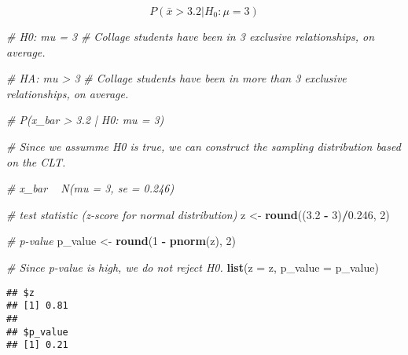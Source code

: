 \documentclass[]{book}
\newenvironment{Shaded}{\begin{snugshade}}{\end{snugshade}}
\newcommand{\CommentTok}[1]{\textcolor[rgb]{0.56,0.35,0.01}{\textit{#1}}}
\newcommand{\DataTypeTok}[1]{\textcolor[rgb]{0.13,0.29,0.53}{#1}}
\newcommand{\DecValTok}[1]{\textcolor[rgb]{0.00,0.00,0.81}{#1}}
\newcommand{\FloatTok}[1]{\textcolor[rgb]{0.00,0.00,0.81}{#1}}
\newcommand{\KeywordTok}[1]{\textcolor[rgb]{0.13,0.29,0.53}{\textbf{#1}}}
\newcommand{\NormalTok}[1]{#1}
\newcommand{\OperatorTok}[1]{\textcolor[rgb]{0.81,0.36,0.00}{\textbf{#1}}}
\newcommand{\StringTok}[1]{\textcolor[rgb]{0.31,0.60,0.02}{#1}}
\begin{document}
\[
P(\bar{x} > 3.2 | H_0 : \mu = 3)
\]

\begin{Shaded}
\begin{Highlighting}[]
\CommentTok{# H0: mu = 3}
\CommentTok{# Collage students have been in 3 exclusive relationships, on average.}

\CommentTok{# HA: mu > 3}
\CommentTok{# Collage students have been in more than 3 exclusive relationships, on average.}

\CommentTok{# P(x_bar > 3.2 | H0: mu = 3)}

\CommentTok{# Since we assumme H0 is true, we can construct the sampling distribution based on the CLT.}

\CommentTok{# x_bar ~ N(mu = 3, se = 0.246)}

\CommentTok{# test statistic (z-score for normal distribution)}
\NormalTok{z <-}\StringTok{ }\KeywordTok{round}\NormalTok{((}\FloatTok{3.2} \OperatorTok{-}\StringTok{ }\DecValTok{3}\NormalTok{)}\OperatorTok{/}\FloatTok{0.246}\NormalTok{, }\DecValTok{2}\NormalTok{)}

\CommentTok{# p-value}
\NormalTok{p_value <-}\StringTok{ }\KeywordTok{round}\NormalTok{(}\DecValTok{1} \OperatorTok{-}\StringTok{ }\KeywordTok{pnorm}\NormalTok{(z), }\DecValTok{2}\NormalTok{)}

\CommentTok{# Since p-value is high, we do not reject H0.}
\KeywordTok{list}\NormalTok{(}\DataTypeTok{z =}\NormalTok{ z, }\DataTypeTok{p_value =}\NormalTok{ p_value)}
\end{Highlighting}
\end{Shaded}

\begin{verbatim}
## $z
## [1] 0.81
## 
## $p_value
## [1] 0.21
\end{verbatim}

\begin{Shaded}
\end{Shaded}
\end{document}
